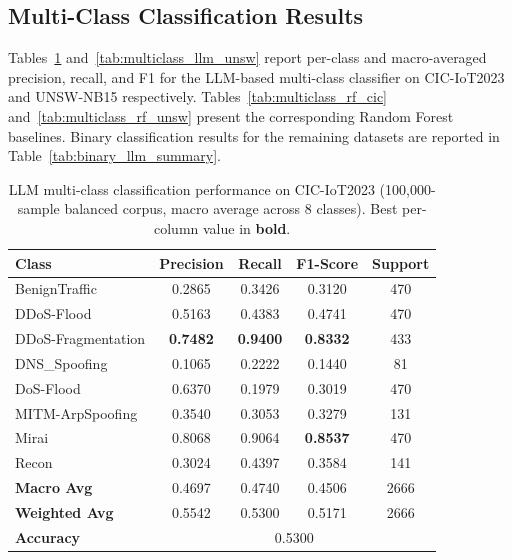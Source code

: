 \subsection{Multi-Class Classification Results}\label{subsec:multiclass_results}

Tables~\ref{tab:multiclass_llm_cic} and~\ref{tab:multiclass_llm_unsw} report
per-class and macro-averaged precision, recall, and F1 for the LLM-based
multi-class classifier on CIC-IoT2023 and UNSW-NB15 respectively.
Tables~\ref{tab:multiclass_rf_cic} and~\ref{tab:multiclass_rf_unsw} present
the corresponding Random Forest baselines. Binary classification results for
the remaining datasets are reported in Table~\ref{tab:binary_llm_summary}.

\begin{table}[htbp]
\centering
\caption{LLM multi-class classification performance on CIC-IoT2023
  (100{,}000-sample balanced corpus, macro average across 8 classes).
  Best per-column value in \textbf{bold}.}
\label{tab:multiclass_llm_cic}
\begin{tabular}{lcccc}
\toprule
\textbf{Class} & \textbf{Precision} & \textbf{Recall} & \textbf{F1-Score} & \textbf{Support} \\
\midrule
BenignTraffic      & 0.2865 & 0.3426 & 0.3120 & 470 \\
DDoS-Flood         & 0.5163 & 0.4383 & 0.4741 & 470 \\
DDoS-Fragmentation & \textbf{0.7482} & \textbf{0.9400} & \textbf{0.8332} & 433 \\
DNS\_Spoofing      & 0.1065 & 0.2222 & 0.1440 &  81 \\
DoS-Flood          & 0.6370 & 0.1979 & 0.3019 & 470 \\
MITM-ArpSpoofing   & 0.3540 & 0.3053 & 0.3279 & 131 \\
Mirai              & 0.8068 & 0.9064 & \textbf{0.8537} & 470 \\
Recon              & 0.3024 & 0.4397 & 0.3584 & 141 \\
\midrule
\textbf{Macro Avg} & 0.4697 & 0.4740 & 0.4506 & 2666 \\
\textbf{Weighted Avg} & 0.5542 & 0.5300 & 0.5171 & 2666 \\
\textbf{Accuracy}  & \multicolumn{4}{c}{0.5300} \\
\bottomrule
\end{tabular}
\end{table}

